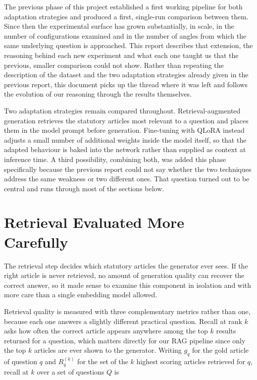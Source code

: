 \documentclass[11pt, a4paper]{article}
\begin{document}
The previous phase of this project established a first working pipeline for both adaptation strategies and produced a first, single-run comparison between them. Since then the experimental surface has grown substantially, in scale, in the number of configurations examined and in the number of angles from which the same underlying question is approached. This report describes that extension, the reasoning behind each new experiment and what each one taught us that the previous, smaller comparison could not show. Rather than repeating the description of the dataset and the two adaptation strategies already given in the previous report, this document picks up the thread where it was left and follows the evolution of our reasoning through the results themselves.

Two adaptation strategies remain compared throughout. Retrieval-augmented generation retrieves the statutory articles most relevant to a question and places them in the model prompt before generation. Fine-tuning with QLoRA instead adjusts a small number of additional weights inside the model itself, so that the adapted behaviour is baked into the network rather than supplied as context at inference time. A third possibility, combining both, was added this phase specifically because the previous report could not say whether the two techniques address the same weakness or two different ones. That question turned out to be central and runs through most of the sections below.

\section{Retrieval Evaluated More Carefully}
\label{sec:retrieval}

The retrieval step decides which statutory articles the generator ever sees. If the right article is never retrieved, no amount of generation quality can recover the correct answer, so it made sense to examine this component in isolation and with more care than a single embedding model allowed.

Retrieval quality is measured with three complementary metrics rather than one, because each one answers a slightly different practical question. Recall at rank $k$ asks how often the correct article appears anywhere among the top $k$ results returned for a question, which matters directly for our RAG pipeline since only the top $k$ articles are ever shown to the generator. Writing $g_q$ for the gold article of question $q$ and $R_q^{(k)}$ for the set of the $k$ highest scoring articles retrieved for $q$, recall at $k$ over a set of questions $Q$ is
\end{document}
